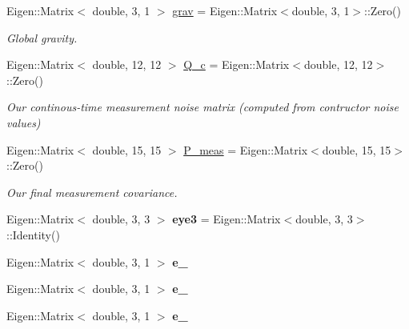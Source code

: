 \begin{DoxyCompactItemize}
Eigen\+::\+Matrix$<$ double, 3, 1 $>$ \hyperlink{classov__core_1_1CpiBase_a43580d4c493d8b44a1c8cab9ad9b8a42}{grav} = Eigen\+::\+Matrix$<$double, 3, 1$>$\+::Zero()
\begin{DoxyCompactList}\small\item\em Global gravity. \end{DoxyCompactList}\item 
\mbox{\label{classov__core_1_1CpiBase_a8e34ef29a4679c8a47c7dacd1bb40c23}} 
Eigen\+::\+Matrix$<$ double, 12, 12 $>$ \hyperlink{classov__core_1_1CpiBase_a8e34ef29a4679c8a47c7dacd1bb40c23}{Q\+\_\+c} = Eigen\+::\+Matrix$<$double, 12, 12$>$\+::Zero()
\begin{DoxyCompactList}\small\item\em Our continous-\/time measurement noise matrix (computed from contructor noise values) \end{DoxyCompactList}\item 
\mbox{\label{classov__core_1_1CpiBase_a67e00ae8c7b77288577a1251de52123a}} 
Eigen\+::\+Matrix$<$ double, 15, 15 $>$ \hyperlink{classov__core_1_1CpiBase_a67e00ae8c7b77288577a1251de52123a}{P\+\_\+meas} = Eigen\+::\+Matrix$<$double, 15, 15$>$\+::Zero()
\begin{DoxyCompactList}\small\item\em Our final measurement covariance. \end{DoxyCompactList}\item 
\mbox{\label{classov__core_1_1CpiBase_ad266689bc9d3bd8b4f2b245ad58b5246}} 
Eigen\+::\+Matrix$<$ double, 3, 3 $>$ {\bfseries eye3} = Eigen\+::\+Matrix$<$double, 3, 3$>$\+::Identity()
\item 
\mbox{\label{classov__core_1_1CpiBase_a486971a8b5022fdd22dcd93d73a44c8c}} 
Eigen\+::\+Matrix$<$ double, 3, 1 $>$ {\bfseries e\+\_}
\item 
\mbox{\label{classov__core_1_1CpiBase_adce734353b7a1f32da8c96014304cfb7}} 
Eigen\+::\+Matrix$<$ double, 3, 1 $>$ {\bfseries e\+\_}
\item 
\mbox{\label{classov__core_1_1CpiBase_a99d311f75307cdbc40e535beecb0842b}} 
Eigen\+::\+Matrix$<$ double, 3, 1 $>$ {\bfseries e\+\_}

\end{DoxyCompactItemize}
